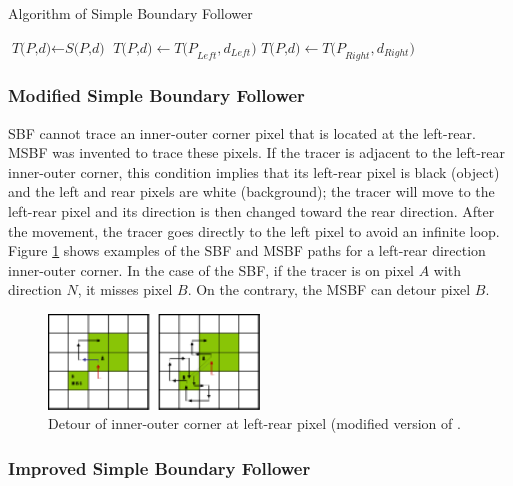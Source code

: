 \begin{algorithm}
\caption{Algorithm of Simple Boundary Follower}\label{alg:sbf}
\begin{algorithmic}[1]
\State $\textit{T(P,d)} \gets \textit{S(P,d)}$
\Do
{}
\State $\textit{T(P,d)} \gets \textit{T(P}_{Left},\textit{d}_{Left} )  $
\Else
\State $\textit{T(P,d)} \gets \textit{T(P}_{Right},\textit{d}_{Right})$
\EndIf
{}
\EndProcedure
\end{algorithmic}
\end{algorithm}

\subsubsection{Modified Simple Boundary Follower}

SBF cannot trace an inner-outer corner pixel that is located at the left-rear. MSBF \cite{Gose1996Pattern} was invented to trace these pixels. If the tracer is adjacent to the left-rear inner-outer corner, this condition implies that its left-rear pixel is black (object) and the left and rear pixels are white (background); the tracer will move to the left-rear pixel and its direction is then changed toward the rear direction. After the movement, the tracer goes directly to the left pixel to avoid an infinite loop. Figure \ref{fig:sbf_msbf} shows examples of the SBF and MSBF paths for a left-rear direction inner-outer corner. In the case of the SBF, if the tracer is on pixel $A$ with direction $N$, it misses pixel $B$. On the contrary, the MSBF can detour pixel $B$.

\begin{figure}[htbp]
	\centering
	\includegraphics[width=0.50\textwidth]{2.RelatedWorks/sbf_msbf.png}
	\caption{Detour of inner-outer corner at left-rear pixel (modified version of \cite{Gose1996Pattern}.}
	\label{fig:sbf_msbf}
\end{figure}

\subsubsection{Improved Simple Boundary Follower}

